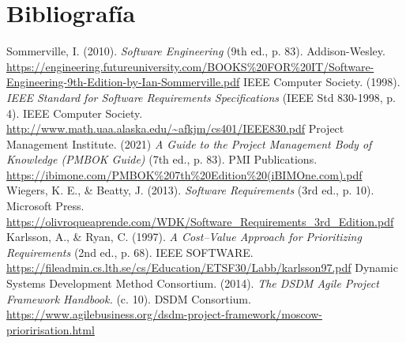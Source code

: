 \section*{Bibliografía}

\begin{thebibliography}{9}
Sommerville, I. (2010).
\textit{Software Engineering} (9th ed., p. 83).
Addison-Wesley.
\url{https://engineering.futureuniversity.com/BOOKS%20FOR%20IT/Software-Engineering-9th-Edition-by-Ian-Sommerville.pdf}
IEEE Computer Society. (1998).
\textit{IEEE Standard for Software Requirements Specifications} (IEEE Std 830-1998, p. 4).
IEEE Computer Society.
\url{http://www.math.uaa.alaska.edu/~afkjm/cs401/IEEE830.pdf}
Project Management Institute. (2021)
\textit{A Guide to the Project Management Body of Knowledge (PMBOK Guide)} (7th ed., p. 83).
PMI Publications.
\url{https://ibimone.com/PMBOK%207th%20Edition%20(iBIMOne.com).pdf}
Wiegers, K. E., \& Beatty, J. (2013).
\textit{Software Requirements} (3rd ed., p. 10).
Microsoft Press.
\url{https://olivroqueaprende.com/WDK/Software_Requirements_3rd_Edition.pdf}
Karlsson, A., \& Ryan, C. (1997).
\textit{A Cost–Value Approach for Prioritizing Requirements} (2nd ed., p. 68).
IEEE SOFTWARE.
\url{https://fileadmin.cs.lth.se/cs/Education/ETSF30/Labb/karlsson97.pdf}
Dynamic Systems Development Method Consortium. (2014).
\textit{The DSDM Agile Project Framework Handbook.} (c. 10).
DSDM Consortium.
\url{https://www.agilebusiness.org/dsdm-project-framework/moscow-prioririsation.html}
\end{thebibliography}